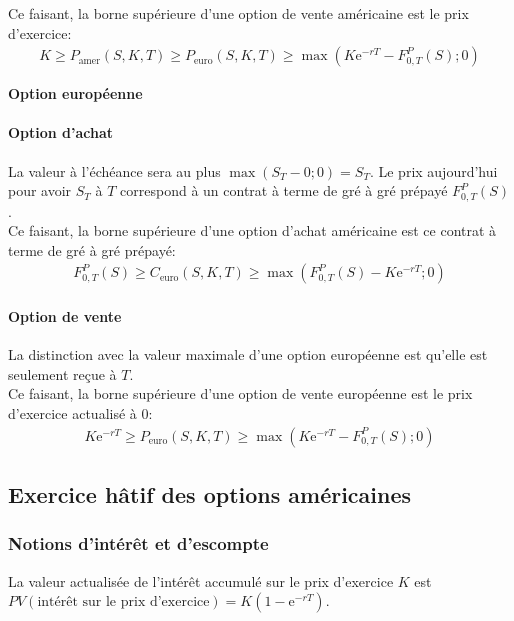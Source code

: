 \documentclass[10pt, french]{article}
\begin{document}
\begin{multicols*}{2}
Ce faisant, \textcolor{cobalt}{la borne supérieure d'une option de vente américaine est le prix d'exercice}:
\begin{align*}
	K	
	\geq	P_{\text{amer}}(S, K, T)
	\geq	P_{\text{euro}}(S, K, T)
	\geq	\max\left(K\textrm{e}^{-rT} - F_{0, T}^{P}(S); 0\right)	
\end{align*}

\begin{center}
	\textbf{Option européenne}
\end{center}

\paragraph{Option d'achat}
La valeur à l'échéance sera au plus $\max(S_{T} - 0; 0) = S_{T}$. Le prix aujourd'hui pour avoir $S_{T}$ à $T$ correspond à un contrat à terme de gré à gré prépayé $F_{0, T}^{P}(S)$.\\

Ce faisant, \textcolor{cobalt}{la borne supérieure d'une option d'achat américaine est ce contrat à terme de gré à gré prépayé}:
\begin{align*}
	F_{0, T}^{P}(S)
	\geq	C_{\text{euro}}(S, K, T)
	\geq	\max\left(F_{0, T}^{P}(S) - K\textrm{e}^{-rT}; 0\right)
\end{align*}

\paragraph{Option de vente}	La distinction avec la valeur maximale d'une option européenne est qu'elle est seulement reçue à $T$.\\

Ce faisant, \textcolor{cobalt}{la borne supérieure d'une option de vente européenne est le prix d'exercice actualisé à 0}:
\begin{align*}
	K \textrm{e}^{-rT}
	\geq	P_{\text{euro}}(S, K, T)
	\geq	\max\left(K\textrm{e}^{-rT} - F_{0, T}^{P}(S); 0\right)
\end{align*}


\subsection*{Exercice hâtif des options américaines}
\subsubsection*{Notions d'intérêt et d'escompte}
La valeur actualisée de l'intérêt accumulé sur le prix d'exercice $K$ est $PV(\text{intérêt sur le prix d'exercice}) = K(1 - \textrm{e}^{-rT})$.\\


\end{multicols*}
\end{document}
